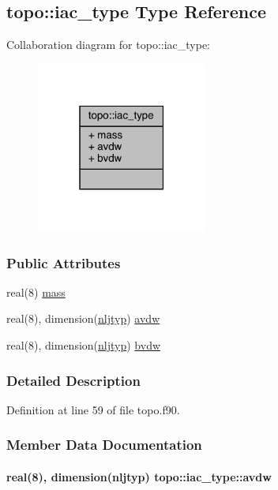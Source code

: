 \hypertarget{structtopo_1_1iac__type}{\subsection{topo\-:\-:iac\-\_\-type Type Reference}
\label{structtopo_1_1iac__type}
}


Collaboration diagram for topo\-:\-:iac\-\_\-type\-:
\nopagebreak
\begin{figure}[H]
\begin{center}
\leavevmode
\includegraphics[width=159pt]{structtopo_1_1iac__type__coll__graph}
\end{center}
\end{figure}
\subsubsection*{Public Attributes}
\begin{DoxyCompactItemize}
\item 
real(8) \hyperlink{structtopo_1_1iac__type_ab0e1dbc161092a0b96ecf18007c0f5e1}{mass}
\item 
real(8), dimension(\hyperlink{classtopo_a81ba8fdc81bafeeebc27023f5e279b61}{nljtyp}) \hyperlink{structtopo_1_1iac__type_a62f3fecb8c1eff0a31669cfdcae44214}{avdw}
\item 
real(8), dimension(\hyperlink{classtopo_a81ba8fdc81bafeeebc27023f5e279b61}{nljtyp}) \hyperlink{structtopo_1_1iac__type_a74344ad0a75fa91302a6225ed4de57a4}{bvdw}
\end{DoxyCompactItemize}


\subsubsection{Detailed Description}


Definition at line 59 of file topo.\-f90.



\subsubsection{Member Data Documentation}
\hypertarget{structtopo_1_1iac__type_a62f3fecb8c1eff0a31669cfdcae44214}{
\paragraph[{avdw}]{\setlength{\rightskip}{0pt plus 5cm}real(8), dimension({\bf nljtyp}) topo\-::iac\-\_\-type\-::avdw}}\label{structtopo_1_1iac__type_a62f3fecb8c1eff0a31669cfdcae44214}


